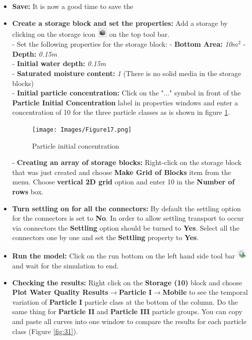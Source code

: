 \begin{itemize}
\item \textbf{Save: } It is now a good time to save the
\item \textbf{Create a storage block and set the properties: } Add a storage by clicking on the storage icon \includegraphics[width=0.5cm]{Icons/storage_icon.png} on the top tool bar. \\
- Set the following properties for the storage block:
- \textbf{Bottom Area: }\textit{10$m^2$}
- \textbf{Depth: }\textit{0.15m} \\
- \textbf{Initial water depth: }\textit{0.15m} \\
- \textbf{Saturated moisture content: } \textit{1} (There is no solid media in the storage blocks) \\ 
- \textbf{Initial particle concentration: } Click on the "..." symbol in front of the \textbf{Particle Initial Concentration} label in properties windows and enter a concentration of 10 for the three particle classes as is shown in figure \ref{fig:17}.  \\
\begin{figure}[!ht]\label{fig:17}
\begin{center}
\texttt{[image: Images/Figure17.png]} \\
\caption{Particle initial concentration} 
\end{center}
\end{figure}
- \textbf{Creating an array of storage blocks: } Right-click on the storage block that was just created and choose \textbf{Make Grid of Blocks} item from the menu. Choose \textbf{vertical 2D grid} option and enter 10 in the \textbf{Number of rows} box. 
\item \textbf{Turn settling on for all the connectors: } By default the settling option for the connectors is set to \textbf{No}. In order to allow settling transport to occur via connectors the \textbf{Settling} option should be turned to \textbf{Yes}. Select all the connectors one by one and set the \textbf{Settling} property to \textbf{Yes}.
\item \textbf{Run the model: } Click on the run bottom on the left hand side tool bar \includegraphics[width=0.5cm]{Icons/run_icon.png} and wait for the simulation to end. 
\item \textbf{Checking the results: } Right click on the \textbf{Storage (10)} block and choose \textbf{Plot Water Quality Results}$\rightarrow$\textbf{Particle I}$\rightarrow$\textbf{Mobile} to see the temporal variation of \textbf{Particle I} particle class at the bottom of the column. Do the same thing for \textbf{Particle II} and \textbf{Particle III} particle groups. You can copy and paste all curves into one window to compare the results for each particle class (Figure \ref{fig:31}). 

\end{itemize}
